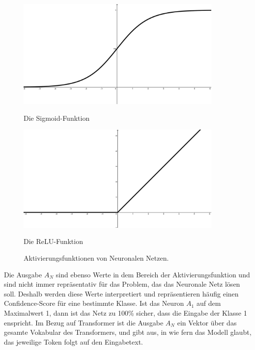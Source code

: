 \begin{figure}
    \centering
    \begin{minipage}{0.45\textwidth}
        \centering
        \includegraphics[width=0.9\textwidth]{zeichnungen/sigmoid.png}
        \caption*{Die Sigmoid-Funktion}
    \end{minipage}\hfill
    \begin{minipage}{0.45\textwidth}
        \centering
        \includegraphics[width=0.9\textwidth]{zeichnungen/relu.png}
        \caption*{Die ReLU-Funktion}
    \end{minipage}
    \caption{Aktivierungsfunktionen von Neuronalen Netzen.}\label{activation_functions}
\end{figure}

Die Ausgabe $A_N$ sind ebenso Werte in dem Bereich der Aktivierungsfunktion und sind nicht immer repräsentativ für das Problem, das das Neuronale Netz lösen soll.
Deshalb werden diese Werte interpretiert und repräsentieren häufig einen Confidence-Score für eine bestimmte Klasse.
Ist das Neuron $A_1$ auf dem Maximalwert 1, dann ist das Netz zu 100\% sicher, dass die Eingabe der Klasse 1 enspricht.
Im Bezug auf Transformer ist die Ausgabe $A_N$ ein Vektor über das gesamte Vokabular des Transformers, und gibt aus, in wie fern das Modell glaubt, das jeweilige Token folgt auf den Eingabetext.\\

